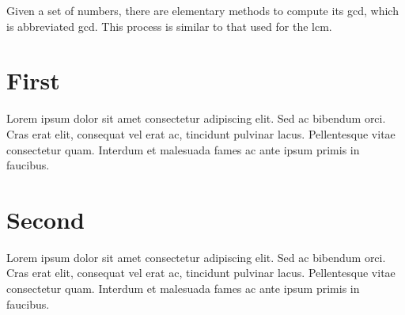 \documentclass[11pt, a4paper]{report}
\begin{document}
Given a set of numbers, there are elementary methods to compute 
its \acrlong{gcd}, which is abbreviated \acrshort{gcd}. This 
process is similar to that used for the \acrfull{lcm}.

\clearpage

\printglossary[title=Glossário, toctitle=Glossário]


\clearpage



\begin{appendices}

\chapter{First}
\par Lorem ipsum dolor sit amet consectetur adipiscing elit. Sed ac bibendum orci. Cras erat elit, consequat vel erat ac, tincidunt pulvinar lacus. Pellentesque vitae consectetur quam. Interdum et malesuada fames ac ante ipsum primis in faucibus.
\clearpage

\chapter{Second}
\par Lorem ipsum dolor sit amet consectetur adipiscing elit. Sed ac bibendum orci. Cras erat elit, consequat vel erat ac, tincidunt pulvinar lacus. Pellentesque vitae consectetur quam. Interdum et malesuada fames ac ante ipsum primis in faucibus.
\clearpage

\end{appendices}
\end{document}

